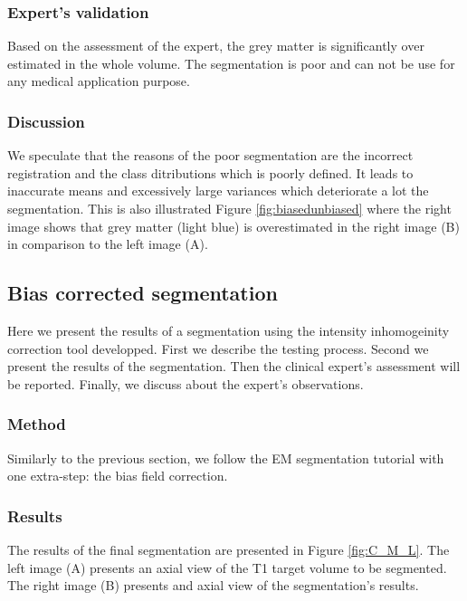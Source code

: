   
\subsubsection{Expert's validation}
Based on the assessment of the expert, the grey matter is significantly over estimated in the whole volume. The segmentation is poor and can not be use for any medical application purpose. 

\subsubsection{Discussion}
We speculate that the reasons of the poor segmentation are the incorrect registration and the class ditributions which is poorly defined. It leads to inaccurate means and excessively large variances which deteriorate a lot the segmentation. This is also illustrated Figure \ref{fig:biasedunbiased} where the right image shows that grey matter (light blue) is overestimated in the right image (B) in comparison to the left image (A).

\subsection{Bias corrected segmentation}
%
Here we present the results of a segmentation using the intensity inhomogeinity correction tool developped. First we describe the testing process. Second we present the results of the segmentation. Then the clinical expert's assessment will be reported. Finally, we discuss about the expert's observations.
%
\subsubsection{Method}
Similarly to the previous section, we follow the EM segmentation tutorial with one extra-step: the bias field correction.

%
\subsubsection{Results}
The results of the final segmentation are presented in Figure \ref{fig:C_M_L}. The left image (A) presents an axial view of the T1 target volume to be segmented. The right image (B) presents and axial view of the segmentation's results.
%

